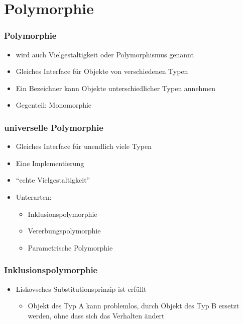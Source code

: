 \section{Polymorphie}


{
\begin{frame}
	\frametitle{Polymorphie}
	\begin{itemize}
		\item wird auch Vielgestaltigkeit oder Polymorphismus genannt
		\item Gleiches Interface für Objekte von verschiedenen Typen
		\item Ein Bezeichner kann Objekte unterschiedlicher Typen annehmen
		\item Gegenteil: Monomorphie
	\end{itemize}
	
\end{frame}
}

{
\begin{frame}
	\frametitle{universelle Polymorphie}
	\begin{itemize}
		\item Gleiches Interface für unendlich viele Typen
		\item Eine Implementierung
		\item ``echte Vielgestaltigkeit''
		\item Unterarten:
		\begin{itemize}
			\item Inklusionspolymorphie
			\item Vererbungspolymorphie
			\item Parametrische Polymorphie
		\end{itemize}
	\end{itemize}
\end{frame}
}


{
\begin{frame}
	\frametitle{Inklusionspolymorphie}
	\begin{itemize}
		\item Liskovsches Substitutionsprinzip ist erfüllt
		\begin{itemize}
			\item Objekt des Typ A kann problemlos, durch Objekt des Typ B ersetzt werden, ohne dass sich das Verhalten ändert
		\end{itemize}
	\end{itemize}
\end{frame}
}

